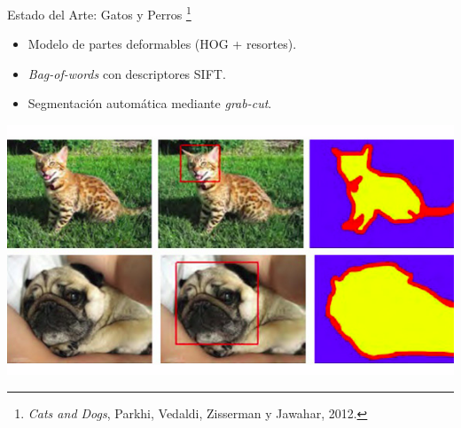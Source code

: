 \documentclass{beamer}
\begin{document}
    \begin{frame}{Estado del Arte: Gatos y Perros \footnote{\emph{Cats and
        Dogs}, Parkhi, Vedaldi, Zisserman y Jawahar, 2012.}}
        \begin{itemize}
            \item Modelo de partes deformables (HOG + resortes).
            \item \emph{Bag-of-words} con descriptores SIFT. 
            \item Segmentación automática mediante \emph{grab-cut}.
        \end{itemize}
        \begin{center}
            \includegraphics[scale=0.3]{imagen/catsanddogs_annotation}
        \end{center}
	\end{frame}
\end{document}
